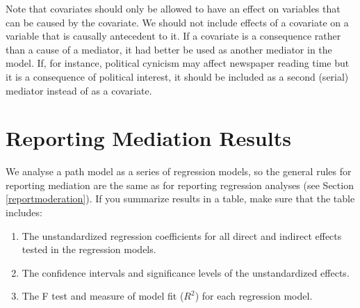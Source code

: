 \documentclass[a4paper]{book}
\theoremstyle{definition}
\theoremstyle{definition}
\theoremstyle{definition}
\theoremstyle{remark}
\begin{document}
Note that covariates should only be allowed to have an effect on
variables that can be caused by the covariate. We should not include
effects of a covariate on a variable that is causally antecedent to it.
If a covariate is a consequence rather than a cause of a mediator, it
had better be used as another mediator in the model. If, for instance,
political cynicism may affect newspaper reading time but it is a
consequence of political interest, it should be included as a second
(serial) mediator instead of as a covariate.

\section{Reporting Mediation Results}\label{reporting-mediation-results}

We analyse a path model as a series of regression models, so the general
rules for reporting mediation are the same as for reporting regression
analyses (see Section \ref{reportmoderation}). If you summarize results
in a table, make sure that the table includes:

\begin{enumerate}
\def\labelenumi{\arabic{enumi}.}
\item
  The unstandardized regression coefficients for all direct and indirect
  effects tested in the regression models.
\item
  The confidence intervals and significance levels of the unstandardized
  effects.
\item
  The F test and measure of model fit (\(R^2\)) for each regression
  model.
\end{enumerate}
\end{document}
